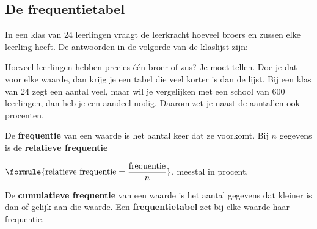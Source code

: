 
\begin{oefeningen}

\end{oefeningen}

\subsection{De frequentietabel}

In een klas van 24 leerlingen vraagt de leerkracht hoeveel broers en zussen elke leerling heeft. De antwoorden in de volgorde van de klaslijst zijn:


Hoeveel leerlingen hebben precies één broer of zus? Je moet tellen. Doe je dat voor elke waarde, dan krijg je een tabel die veel korter is dan de lijst. Bij een klas van 24 zegt een aantal veel, maar wil je vergelijken met een school van 600 leerlingen, dan heb je een aandeel nodig. Daarom zet je naast de aantallen ook procenten.

\begin{theorie}
De \textbf{\textcolor{accent}{frequentie}} van een waarde is het aantal keer dat ze voorkomt. Bij $n$ gegevens is de \textbf{\textcolor{accent}{relatieve frequentie}}

\vspace{1mm}
\qquad $\formule{\text{relatieve frequentie} = \dfrac{\text{frequentie}}{n}}$, \qquad meestal in procent.

\vspace{1mm}
De \textbf{\textcolor{accent}{cumulatieve frequentie}} van een waarde is het aantal gegevens dat kleiner is dan of gelijk aan die waarde. Een \textbf{\textcolor{accent}{frequentietabel}} zet bij elke waarde haar frequentie.
\end{theorie}

